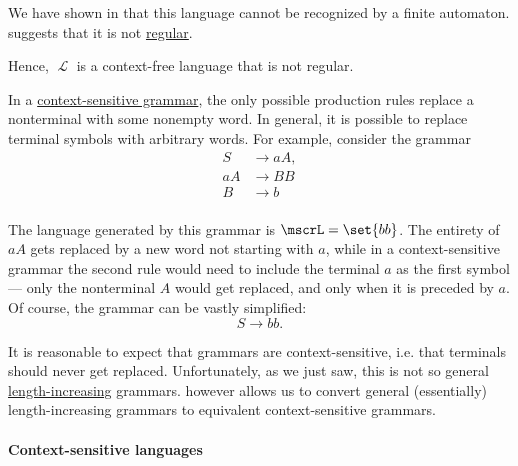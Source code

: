 \begin{example}
\begin{thmenum}
    We have shown in  that this language cannot be recognized by a finite automaton.  suggests that it is not \hyperref[def:chomsky_hierarchy/regular]{regular}.

    Hence, \( \mscrL \) is a context-free language that is not regular.

     In a \hyperref[def:chomsky_hierarchy/context_sensitive]{context-sensitive grammar}, the only possible production rules replace a nonterminal with some nonempty word. In general, it is possible to replace terminal symbols with arbitrary words. For example, consider the grammar
    \begin{equation*}
      \begin{aligned}
         S &\to aA, \\
        aA &\to BB \\
         B &\to b \\
      \end{aligned}
    \end{equation*}

    The language generated by this grammar is \( \mscrL = \set{ bb } \). The entirety of \( aA \) gets replaced by a new word not starting with \( a \), while in a context-sensitive grammar the second rule would need to include the terminal \( a \) as the first symbol --- only the nonterminal \( A \) would get replaced, and only when it is preceded by \( a \). Of course, the grammar can be vastly simplified:
    \begin{equation*}
      S \to bb.
    \end{equation*}

    It is reasonable to expect that grammars are context-sensitive, i.e. that terminals should never get replaced. Unfortunately, as we just saw, this is not so general \hyperref[def:length_increasing_grammar]{length-increasing} grammars.  however allows us to convert general (essentially) length-increasing grammars to equivalent context-sensitive grammars.
  \end{thmenum}
\end{example}

\paragraph{Context-sensitive languages}

